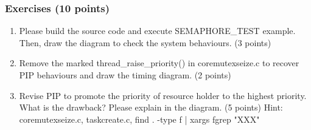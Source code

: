 \documentclass[t]{beamer}
\begin{document}
\begin{frame}
\frametitle{Exercises (10 points)}
\begin{enumerate}
\item Please build the source code and execute SEMAPHORE\_TEST example. Then, draw the diagram to check the system behaviours. (3 points)
\item Remove the marked thread\_raise\_priority() in coremutexseize.c to recover PIP behaviours and draw the timing diagram. (2 points)
\item Revise PIP to promote the priority of resource holder to the highest priority. What is the drawback? Please explain in the diagram. (5 points)
\newline Hint: coremutexseize.c, taskcreate.c, find . -type f | xargs fgrep "XXX" 
\end{enumerate}
\end{frame}
\end{document}
